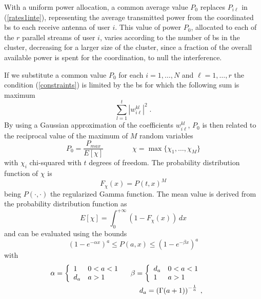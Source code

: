 With a uniform power allocation, a common average value $P_{0}$ replaces $P_{i\ell}$ in (\ref{rates1inte}), representing the average transmitted power from the coordinated \gls{bs} to each receive antenna of user $i$. This value of power $P_{0}$, allocated to each of the $r$ parallel streams of user $i$, varies according to the number of \gls{bs} in the cluster, decreasing for a larger size of the cluster, since a fraction of the overall available power is spent for the coordination, to null the interference. 

If we substitute a common value $P_0$ for each $i=1,\ldots,N$ and $\ell=1,\ldots,r$ the condition (\ref{constraints}) is limited by the \gls{bs} for which the following sum is maximum 
\begin{equation}
	\sum_{l=1}^{t} \left|w_{i\ell}^{kl}\right|^2 \;.
\end{equation}
By using a Gaussian approximation of the coefficients $w_{i\ell}^{kl}$, $P_0$ is then related to the reciprocal value of the maximum of $M$ random variables
\begin{equation}
	P_0=\frac{P_{max}}{E[\chi]}\qquad\qquad\chi =\max \{\chi_1,\ldots, \chi_M\}
\end{equation}
with $\chi_i$ chi-squared with $t$ degrees of freedom.
The probability distribution function of $\chi$ is 
\begin{equation}
	F_{\chi}(x)= P\left(t, x\right)^M
\end{equation}
being $P(\cdot, \cdot)$ the regularized Gamma function.
The mean value is derived from the probability distribution function as
\begin{equation}
	E[\chi]=\int_0^{+\infty} \left(1-F_\chi(x)\right)\, dx
\end{equation}
and can be evaluated using the bounds
\begin{equation}
    (1-e^{-\alpha x})^{a}\leq P(a, x)\leq (1-e^{-\beta x})^{a}
\end{equation}
with
\begin{eqnarray}
    &&\hspace*{-10mm}\alpha=\left\{ \begin{array}{ll}1  &0<a<1\\ d_a &a>1\end{array}\right.\quad \beta=\left\{ \begin{array}{ll}d_a  &0<a<1\\1 &a>1\end{array}\right.\\
	&&\hspace*{-10mm}d_a = \left(\Gamma(a+1)\right)^{-\frac{1}{a}}\;,
\end{eqnarray}
